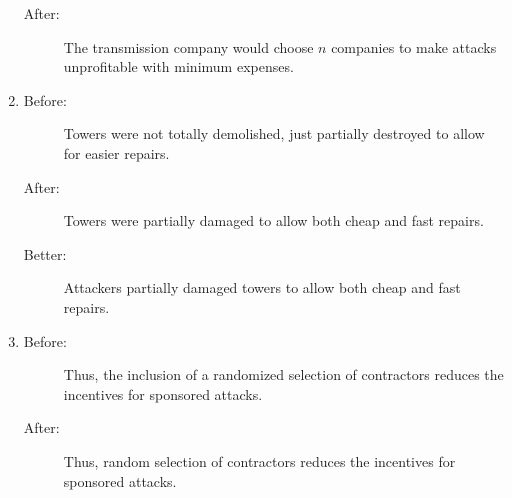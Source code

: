 \documentclass[a4paper,10pt]{article}
\begin{document}
\begin{enumerate}
\begin{description}
 \item[After:] The transmission company would choose $n$ companies to make attacks unprofitable with minimum expenses.
\end{description}


\item 
\begin{description}
 \item[Before:] Towers were not totally demolished, just partially destroyed to allow for easier repairs.
 
 \item[After:] Towers were partially damaged to allow both cheap and fast repairs.
 
 \item[Better:] Attackers partially damaged towers to allow both cheap and fast repairs.
\end{description}


\item
\begin{description}
 \item[Before:] Thus, the inclusion of a randomized selection of contractors reduces the incentives for sponsored attacks.
 
 \item[After:] Thus, random selection of contractors reduces the incentives for sponsored attacks.
\end{description}


\end{enumerate}
\end{document}
